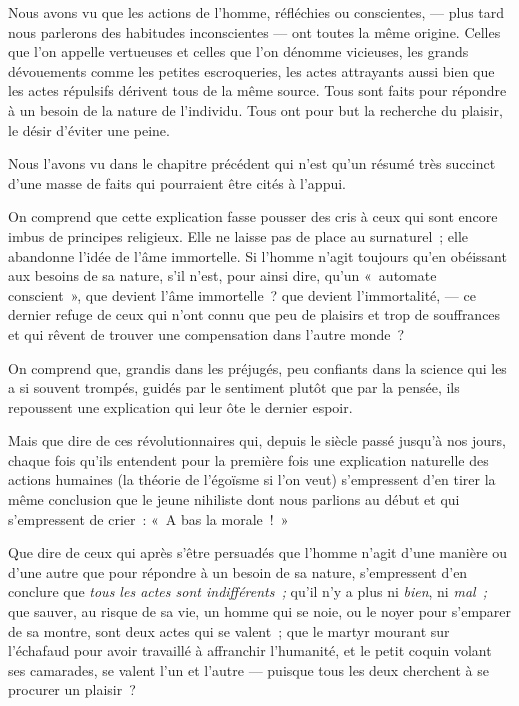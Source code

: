 \documentclass[french,twoside]{book} %
\begin{document}
\noindent Nous avons vu que les actions de l’homme, réfléchies ou conscientes, — plus tard nous parlerons des habitudes inconscientes — ont toutes la même origine. Celles que l’on appelle vertueuses et celles que l’on dénomme vicieuses, les grands dévouements comme les petites escroqueries, les actes attrayants aussi bien que les actes répulsifs dérivent tous de la même source. Tous sont faits pour répondre à un besoin de la nature de l’individu. Tous ont pour but la recherche du plaisir, le désir d’éviter une peine.\par
Nous l’avons vu dans le chapitre précédent qui n’est qu’un résumé très succinct d’une masse de faits qui pourraient être cités à l’appui.\par
On comprend que cette explication fasse pousser des cris à ceux qui sont encore imbus de principes religieux. Elle ne laisse pas de place au surnaturel ; elle abandonne l’idée de l’âme immortelle. Si l’homme n’agit toujours qu’en obéissant aux besoins de sa nature, s’il n’est, pour ainsi dire, qu’un « automate conscient », que devient l’âme immortelle ? que devient l’immortalité, — ce dernier refuge de ceux qui n’ont connu que peu de plaisirs et trop de souffrances et qui rêvent de trouver une compensation dans l’autre monde ?\par
On comprend que, grandis dans les préjugés, peu confiants dans la science qui les a si souvent trompés, guidés par le sentiment plutôt que par la pensée, ils repoussent une explication qui leur ôte le dernier espoir.\par
\bigbreak
\noindent Mais que dire de ces révolutionnaires qui, depuis le siècle passé jusqu’à nos jours, chaque fois qu’ils entendent pour la première fois une explication naturelle des actions humaines (la théorie de l’égoïsme si l’on veut) s’empressent d’en tirer la même conclusion que le jeune nihiliste dont nous parlions au début et qui s’empressent de crier : « A bas la morale ! »\par
Que dire de ceux qui après s’être persuadés que l’homme n’agit d’une manière ou d’une autre que pour répondre à un besoin de sa nature, s’empressent d’en conclure que \emph{tous les actes sont indifférents ;} qu’il n’y a plus ni \emph{bien}, ni \emph{mal ;} que sauver, au risque de sa vie, un homme qui se noie, ou le noyer pour s’emparer de sa montre, sont deux actes qui se valent ; que le martyr mourant sur l’échafaud pour avoir travaillé à affranchir l’humanité, et le petit coquin volant ses camarades, se valent l’un et l’autre — puisque tous les deux cherchent à se procurer un plaisir ?\par
\end{document}
